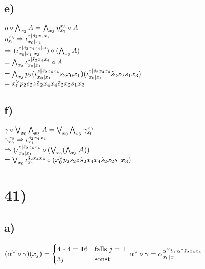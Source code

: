 \documentclass[11pt]{amsart}
\begin{document}
\subsection*{e)}
$\eta \circ \bigwedge_{x_3}A = \bigwedge_{x_3} \eta^{x_3}_{x_3} \circ A$ \\
$\eta^{x_3}_{x_3} \Rightarrow \iota^{z|\tilde s_2x_4x_4}_{x_0|x_1}$ \\
$\Rightarrow (\iota_{x_0|x_1|x_3}^{z|\tilde s_2x_4 x_4|\omega}) \circ (\bigwedge_{x_3}A)$ \\
$= \bigwedge_{x_3}\iota^{z|\tilde s_2x_4x_4}_{x_0|x_1} \circ A$ \\
$= \bigwedge_{x_3}p_2(\iota^{z|\tilde s_2x_4x_4}_{x_0|x_1}s_2x_0x_1)(\iota^{z|\tilde s_2x_4x_4}_{x_0|x_1}\tilde s_2 x_2 s_1 x_3)$ \\
$= x_0^{\vee}p_2s_2z\tilde s_2x_4x_4 \tilde s_2x_2s_1x_3$ \\
\subsection*{f)}
$\gamma \circ \bigvee_{x_0}\bigwedge_{x_3}A = \bigvee_{x_0}\bigwedge_{x_3} \gamma^{x_0}_{x_0}$ \\
$\gamma^{x_0}_{x_0} \Rightarrow \iota^{\tilde s_2 x_4 x_4}_{x_1}$ \\
$\Rightarrow (\iota^{z|\tilde s_2 x_4 x_4}_{x_0 | x_1} \circ (\bigvee_{x_0}(\bigwedge_{x_3}A))$ \\
$= \bigvee_{x_0} \iota^{\tilde s_2 x_4 x_4}_{x_1} \circ (x_0^{\vee}p_2s_2z\tilde s_2 x_4 x_4 \tilde s_2 x_2 s_1 x_3)$ \\

\section*{41)}
\subsection*{a)}
$(\alpha^{\vee} \circ \gamma) (x_j) = \begin{cases} 4*4 = 16 &\mbox{falls } j=1 \\ 3j &\mbox{sonst} \end{cases}$
$\alpha^{\vee} \circ \gamma = \alpha^{\alpha^{\vee}t_0|\alpha^{\vee}\tilde s_2x_4x_4}_{x_0|x_1}$ \\
\end{document}
